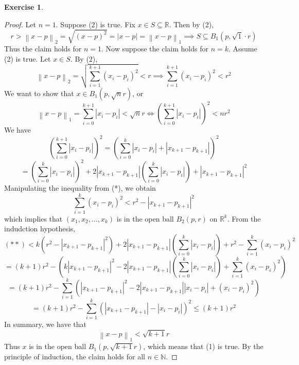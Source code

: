 \documentclass{article}
\theoremstyle{plain} %
\numberwithin{thm}{section} %
\theoremstyle{definition}
\newtheorem{exercise}[thm]{Exercise} %
\begin{document}
\begin{exercise}
\begin{proof}
            Let \(n = 1\). Suppose (2) is true. Fix \(x \in S \subseteq \mathbb{R} \). Then by (2),
            \[
                r > \left\lVert x - p \right\rVert _2 = \sqrt{(x - p)^2} = \left\vert x - p \right\vert = \left\lVert x - p \right\rVert _1 \implies S \subseteq B_1(p, \sqrt{1} \cdot r) 
            \]
            Thus the claim holds for \(n = 1\). Now suppose the claim holds for \(n = k\). Assume (2) is true. Let \(x \in S\). By (2),
            \[
                \left\lVert x - p \right\rVert _2 = \sqrt{\sum_{i=1}^{k+1} (x_i - p_i)^2} < r \implies \sum_{i=1}^{k+1} (x_i - p_i)^2 < r^2\tag{*}
            \]
            We want to show that \(x \in B_1(p, \sqrt{n} r)\), or
            \[
                \left\lVert x - p \right\rVert _1 = \sum_{i=0}^{k+1} \left\vert x_i - p_i \right\vert < \sqrt{n} r \iff \left(\sum_{i=0}^{k+1} \left\vert x_i - p_i \right\vert\right)^2 < nr^2 
            \]
            We have
            \[
                \left(\sum_{i=0}^{k+1} \left\vert x_i - p_i \right\vert\right)^2 = \left(\sum_{i=0}^{k} \left\vert x_i - p_i \right\vert + \left\vert x_{k+1} - p_{k+1} \right\vert \right)^2
            \]
            \[
                = \left(\sum_{i=0}^{k} \left\vert x_i - p_i \right\vert\right)^2 + 2\left\vert x_{k+1} - p_{k+1} \right\vert \left(\sum_{i=0}^{k} \left\vert x_i - p_i \right\vert\right) + \left\vert x_{k+1} - p_{k+1} \right\vert ^2 \tag{**}
            \]
            Manipulating the inequality from (*), we obtain
            \[
                \sum_{i=1}^{k} (x_i - p_i)^2 < r^2 - \left\vert x_{k+1} - p_{k+1}  \right\vert ^2
            \]
            which implies that \((x_1, x_2, \dots , x_k)\) is in the open ball \(B_2(p, r)\) on \(\mathbb{R} ^k\). From the indudction hypothesis,
            \[
                (**) < k(r^2 - \left\vert x_{k+1} - p_{k+1}  \right\vert ^2) + 2\left\vert x_{k+1} - p_{k+1} \right\vert \left(\sum_{i=0}^{k} \left\vert x_i - p_i \right\vert\right) + r^2 - \sum_{i=1}^{k} (x_i - p_i)^2
            \]
            \[
                = (k+1)r^2 - \left(k\left\vert x_{k+1} - p_{k+1}  \right\vert ^2 - 2\left\vert x_{k+1} - p_{k+1} \right\vert \left(\sum_{i=0}^{k} \left\vert x_i - p_i \right\vert\right) + \sum_{i=1}^{k} (x_i - p_i)^2\right)
            \]
            \[
                = (k+1)r^2 - \sum_{i=1}^k \left(\left\vert x_{k+1} - p_{k+1}  \right\vert ^2 - 2\left\vert x_{k+1} - p_{k+1} \right\vert\left\vert x_i - p_i \right\vert + (x_i - p_i)^2\right)
            \]
            \[
                = (k+1)r^2 - \sum_{i=1}^k \left(\left\vert x_{k+1} - p_{k+1}  \right\vert - \left\vert x_i - p_i \right\vert \right) ^2 \leq (k+1)r^2
            \]
            In summary, we have that
            \[
                \left\lVert x - p \right\rVert _1 < \sqrt{k+1} r
            \]
            Thus \(x\) is in the open ball \(B_1(p, \sqrt{k+1} r)\), which means that (1) is true. By the principle of induction, the claim holds for all \(n \in \mathbb{N} \). 


\end{proof}
\end{exercise}
\end{document}
